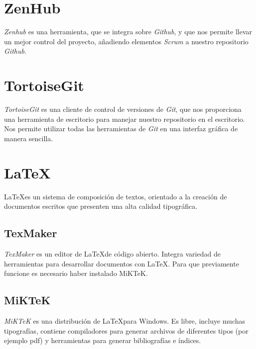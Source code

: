 \section{ZenHub}
\textit{Zenhub} es una herramienta, que se integra sobre \textit{Github}, y que nos permite llevar un mejor control del proyecto, añadiendo elementos \textit{Scrum} a nuestro repositorio \textit{Github}.

\section{TortoiseGit}
\textit{TortoiseGit} es una cliente de control de versiones de \textit{Git}, que nos proporciona una herramienta de escritorio para manejar nuestro repositorio en el escritorio. Nos permite utilizar todas las herramientas de \textit{Git} en una interfaz gráfica de manera sencilla.

\section{\LaTeX}
\LaTeX es un sistema de composición de textos, orientado a la creación de documentos escritos que presenten una alta calidad tipográfica. \cite{wiki:latex} 

\subsection{TexMaker}
\textit{TexMaker} es un editor de \LaTeX de código abierto. Integra variedad de herramientas para desarrollar documentos con \LaTeX. Para que previamente funcione es necesario haber instalado MiKTeK.

\subsection{MiKTeK}
\textit{MiKTeK} es una distribución de \LaTeX para Windows. Es libre, incluye muchas tipografías, contiene compiladores para generar archivos de diferentes tipos (por ejemplo pdf) y herramientas para generar bibliografías e índices.
